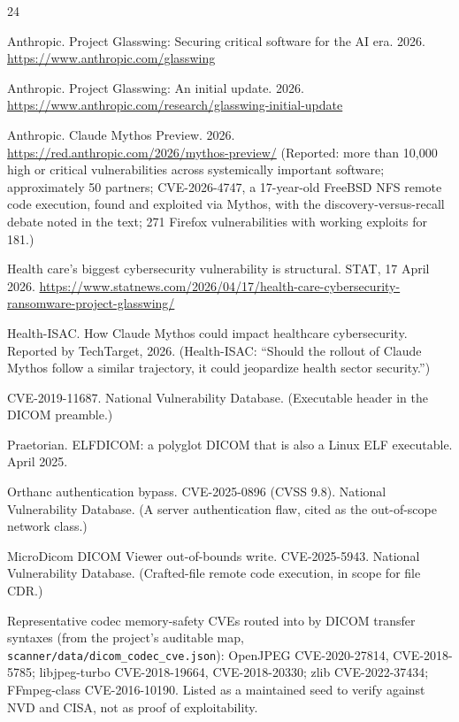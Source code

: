 \documentclass[11pt]{article}
\begin{document}
\begin{thebibliography}{24}
\small

 Anthropic. Project Glasswing: Securing critical software for the AI era. 2026. \url{https://www.anthropic.com/glasswing}

 Anthropic. Project Glasswing: An initial update. 2026. \url{https://www.anthropic.com/research/glasswing-initial-update}

 Anthropic. Claude Mythos Preview. 2026. \url{https://red.anthropic.com/2026/mythos-preview/} (Reported: more than 10,000 high or critical vulnerabilities across systemically important software; approximately 50 partners; CVE-2026-4747, a 17-year-old FreeBSD NFS remote code execution, found and exploited via Mythos, with the discovery-versus-recall debate noted in the text; 271 Firefox vulnerabilities with working exploits for 181.)

 Health care's biggest cybersecurity vulnerability is structural. STAT, 17 April 2026. \url{https://www.statnews.com/2026/04/17/health-care-cybersecurity-ransomware-project-glasswing/}

 Health-ISAC. How Claude Mythos could impact healthcare cybersecurity. Reported by TechTarget, 2026. (Health-ISAC: ``Should the rollout of Claude Mythos follow a similar trajectory, it could jeopardize health sector security.'')

 CVE-2019-11687. National Vulnerability Database. (Executable header in the DICOM preamble.)

 Praetorian. ELFDICOM: a polyglot DICOM that is also a Linux ELF executable. April 2025.

 Orthanc authentication bypass. CVE-2025-0896 (CVSS 9.8). National Vulnerability Database. (A server authentication flaw, cited as the out-of-scope network class.)

 MicroDicom DICOM Viewer out-of-bounds write. CVE-2025-5943. National Vulnerability Database. (Crafted-file remote code execution, in scope for file CDR.)

 Representative codec memory-safety CVEs routed into by DICOM transfer syntaxes (from the project's auditable map, \texttt{scanner/data/dicom\_codec\_cve.json}): OpenJPEG CVE-2020-27814, CVE-2018-5785; libjpeg-turbo CVE-2018-19664, CVE-2018-20330; zlib CVE-2022-37434; FFmpeg-class CVE-2016-10190. Listed as a maintained seed to verify against NVD and CISA, not as proof of exploitability.


\end{thebibliography}
\end{document}
